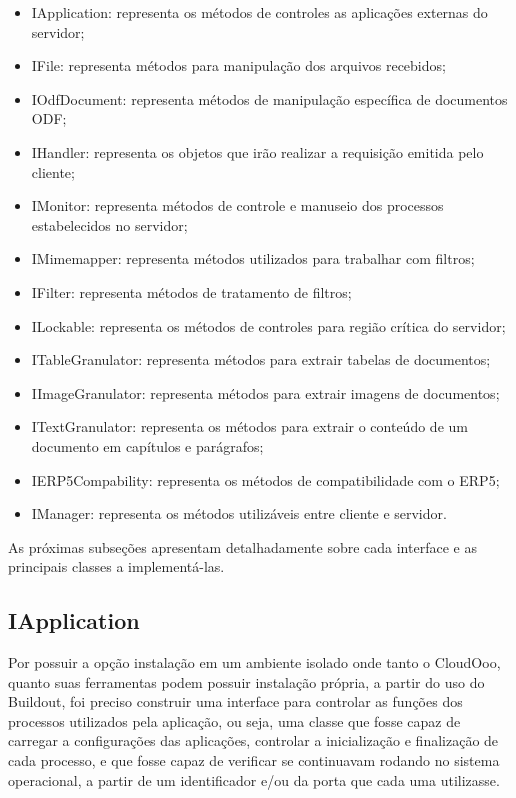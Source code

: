 \begin{itemize}
    \item{IApplication: representa os métodos de controles as aplicações externas do servidor;}
    \item{IFile: representa métodos para manipulação dos arquivos recebidos;}
    \item{IOdfDocument: representa métodos de manipulação específica de documentos ODF;}
    \item{IHandler: representa os objetos que irão realizar a requisição emitida pelo cliente;}
    \item{IMonitor: representa métodos de controle e manuseio dos processos estabelecidos no servidor;}
    \item{IMimemapper: representa métodos utilizados para trabalhar com filtros;}
    \item{IFilter: representa métodos de tratamento de filtros;}
    \item{ILockable: representa os métodos de controles para região crítica do servidor;}
    \item{ITableGranulator: representa métodos para extrair tabelas de documentos;}
    \item{IImageGranulator: representa métodos para extrair imagens de documentos;}
    \item{ITextGranulator: representa os métodos para extrair o conteúdo de um documento em capítulos e parágrafos;}
    \item{IERP5Compability: representa os métodos de compatibilidade com o ERP5;}
    \item{IManager: representa os métodos utilizáveis entre cliente e servidor.}
\end{itemize}

As próximas subseções apresentam detalhadamente sobre cada interface e as principais classes a implementá-las.


\subsection{IApplication}
\label{iapplication}

Por possuir a opção instalação em um ambiente isolado onde tanto o CloudOoo, quanto suas ferramentas podem possuir instalação própria, a partir do uso do Buildout, foi preciso construir uma interface para controlar as funções dos processos utilizados pela aplicação, ou seja, uma classe que fosse capaz de carregar a configurações das aplicações, controlar a inicialização e finalização de cada processo, e que fosse capaz de verificar se continuavam rodando no sistema operacional, a partir de um identificador e/ou da porta que cada uma utilizasse.


